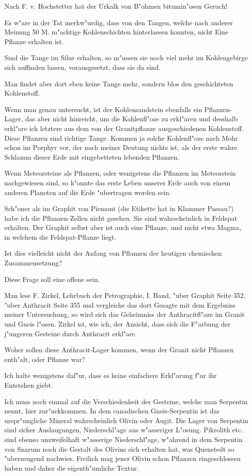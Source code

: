\documentclass[a4paper, 11pt, oneside, german]{article}
\begin{document}
Nach F. v. Hochstetter hat der Urkalk von B"ohmen bitumin"osen Geruch!

Es w"are in der Tat merkw"urdig, dass von den Tangen, welche nach anderer Meinung 50 M. m"achtige Kohlenschichten hinterlassen konnten, nicht Eine Pflanze erhalten ist.

Sind die Tange im Silur erhalten, so m"ussen sie noch viel mehr im Kohlengebirge sich auffinden lassen, vorausgesetzt, dass sie da sind.

Man findet aber dort eben keine Tange mehr, sondern blos den geschichteten Kohlenstoff.

Wenn man genau untersucht, ist der Kohlensandstein ebenfalls ein Pflanzen-Lager, das aber nicht hinreicht, um die Kohlenfl"oze zu erkl"aren und desshalb erkl"are ich letztere aus dem von der Granitpflanze ausgeschiedenen Kohlenstoff. Diese Pflanzen sind richtige Tange. Kommen ja solche Kohlenfl"oze nach Mohr schon im Porphyr vor, der nach meiner Deutung nichts ist, als der erste wahre Schlamm dieser Erde mit eingebetteten lebenden Pflanzen.

Wenn Meteorsteine als Pflanzen, oder wenigstens die Pflanzen im Meteorstein nachgewiesen sind, so k"onnte das erste Leben unserer Erde auch von einem anderen Planeten auf die Erde "ubertragen worden sein.

Sch"oner als im Graphit von Piemont (die Etikette hat in Klammer Passau?) habe ich die Pflanzen-Zellen nicht gesehen. Sie sind wahrscheinlich in Feldspat erhalten. Der Graphit selbst aber ist auch eine Pflanze, und nicht etwa Magma, in welchem die Feldspat-Pflanze liegt.

Ist dies vielleicht nicht der Anfang von Pflanzen der heutigen chemischen Zusammensetzung?

Diese Frage soll eine offene sein.

Man lese F. Zirkel, Lehrbuch der Petrographie, I. Band, "uber Graphit Seite 352, "uber Anthracit Seite 355 und vergleiche das dort Gesagte mit dem Ergebniss meiner Untersuchung, so wird sich das Geheimniss der Anthracitfl"oze im Granit und Gneis l"osen. Zirkel ist, wie ich, der Ansicht, dass sich die F"arbung der j"ungeren Gesteine durch Anthracit erkl"are.

Woher sollen diese Anthracit-Lager kommen, wenn der Granit nicht Pflanzen enth"alt, oder Pflanze war?

Ich halte wenigstens daf"ur, dass es keine einfachere Erkl"arung f"ur ihr Entstehen giebt.

Ich muss noch einmal auf die Verschiedenheit der Gesteine, welche man Serpentin nennt, hier zur"uckkommen. In dem canadischen Gneis-Serpentin ist das urspr"ungliche Mineral wahrscheinlich Olivin oder Augit. Die Lager von Serpentin sind sicher Auslaugungen, Niederschl"age aus w"asseriger L"osung. Pikrolith etc. sind ebenso unzweifelhaft w"asserige Niederschl"age, w"ahrend in dem Serpentin von Snarum noch die Gestalt des Olivins sich erhalten hat, was Quenstedt so "uberzeugend nachwies. Freilich mag jener Olivin schon Pflanzen eingeschlossen haben und daher die eigenth"umliche Textur.
\end{document}

